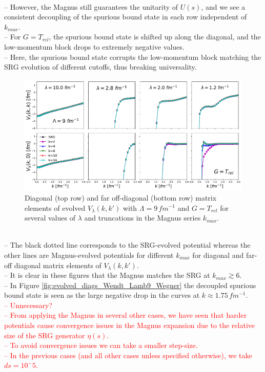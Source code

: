 \documentclass[preprintnumbers,floatfix,aps,prc,preprint,nofootinbib]{revtex4-1}
\begin{document}
\\
-- However, the Magnus still guarantees the unitarity of $U(s)$, and we see a consistent decoupling of the spurious bound state in each row independent of $k_{max}$.
\\
-- For $G=T_{rel}$, the spurious bound state is shifted up along the diagonal, and the low-momentum block drops to extremely negative values.
\\
-- Here, the spurious bound state corrupts the low-momentum block matching the SRG evolution of different cutoffs, thus breaking universality.
\\
%
\begin{figure}
	\captionsetup{singlelinecheck=false,justification=raggedright}
	\centering
	\includegraphics[width=14cm]{evolved_diags_Wendt_Lamb9_T}
	\hspace*{0.05\textwidth}
	\caption{Diagonal (top row) and far off-diagonal (bottom row) matrix elements of evolved $V_{\lambda}(k,k')$ with $\Lambda=9 \, fm^{-1}$ and $G=T_{rel}$ for several values of $\lambda$ and truncations in the Magnus series $k_{max}$.}
	\label{fig:evolved_diags_Wendt_Lamb9_T}
\end{figure}
%
\\
-- The black dotted line corresponds to the SRG-evolved potential whereas the other lines are Magnus-evolved potentials for different $k_{max}$ for diagonal and far-off diagonal matrix elements of $V_{\lambda}(k,k')$.
\\
-- It is clear in these figures that the Magnus matches the SRG at $k_{max} \gtrsim 6$.
\\
-- In Figure \ref{fig:evolved_diags_Wendt_Lamb9_Wegner} the decoupled spurious bound state is seen as the large negative drop in the curves at $k \approx 1.75 \, fm^{-1}$.
\\
\textcolor{red}{%
-- Unnecessary?
\\
-- From applying the Magnus in several other cases, we have seen that harder potentials cause convergence issues in the Magnus expansion due to the relative size of the SRG generator $\eta(s)$.
\\
-- To avoid convergence issues we can take a smaller step-size.
\\
-- In the previous cases (and all other cases unless specified otherwise), we take $ds=10^-5$.
}
\\
\end{document}
